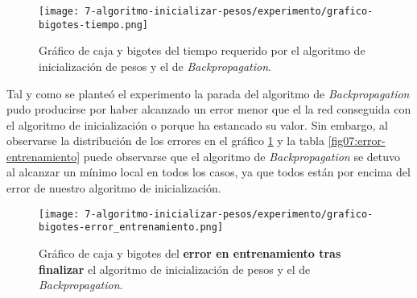 \begin{figure}[H]
    \centering
     \texttt{[image: 7-algoritmo-inicializar-pesos/experimento/grafico-bigotes-tiempo.png]}
     \caption{Gráfico de caja y bigotes del tiempo requerido por el algoritmo de inicialización de pesos y el de \textit{Backpropagation}.}
\end{figure}
\begin{table}[H]
    \centering
    \caption{Error mínimo cuadrático obtenido en entrenamiento tras acabar la ejecución}
    \label{fig07:error-entrenamiento}
\end{table}

Tal y como se planteó el experimento la parada del algoritmo de \textit{Backpropagation} 
pudo producirse por haber alcanzado un error menor que el la red conseguida con el 
algoritmo de inicialización o porque ha estancado su valor.
Sin embargo, al observarse la distribución de los errores en el 
gráfico \ref{img07:error-entrenamiento} y la tabla \ref{fig07:error-entrenamiento} puede observarse que 
el algoritmo de \textit{Backpropagation} se detuvo al alcanzar un 
mínimo local en todos los casos, ya que todos están por encima del error de nuestro algoritmo de inicialización. 

\begin{figure}[H]
    \centering
     \texttt{[image: 7-algoritmo-inicializar-pesos/experimento/grafico-bigotes-error\_entrenamiento.png]}
     \caption{Gráfico de caja y bigotes del \textbf{error en entrenamiento tras finalizar } el algoritmo de inicialización de pesos y el de \textit{Backpropagation}.}
     \label{img07:error-entrenamiento}
\end{figure}

